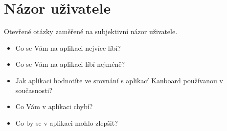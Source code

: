 \section{Názor uživatele}
Otevřené otázky zaměřené na subjektivní názor uživatele.

\begin{itemize}
  \item Co se Vám na aplikaci nejvíce líbí?
  \item Co se Vám na aplikaci líbí nejméně?
  \item Jak aplikaci hodnotíte ve srovnání s aplikací Kanboard používanou v současnosti?
  \item Co Vám v aplikaci chybí?
  \item Co by se v aplikaci mohlo zlepšit?
\end{itemize}